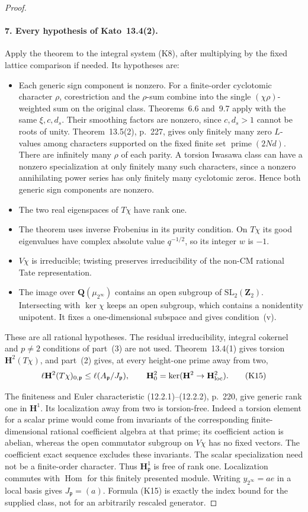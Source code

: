 \begin{proof}
\paragraph{7. Every hypothesis of Kato~13.4(2).}
Apply the theorem to the integral system (K8), after multiplying
by the fixed lattice comparison if needed. Its hypotheses are:
\begin{itemize}
\item Each generic sign component is nonzero. For a finite-order
cyclotomic character $\rho$, corestriction and the $\rho$-sum combine
into the single $(\chi\rho)$-weighted sum on the original class.
Theorems~6.6 and~9.7 apply with the same $\xi,c,d_s$. Their smoothing
factors are nonzero, since $c,d_s>1$ cannot be roots of unity.
Theorem~13.5(2), p.~227, gives only finitely many zero $L$-values
among characters supported on the fixed finite set
$\operatorname{prime}(2Nd)$. There are infinitely many $\rho$ of
each parity. A torsion Iwasawa class can have a nonzero specialization
at only finitely many such characters, since a nonzero annihilating
power series has only finitely many cyclotomic zeros. Hence both
generic sign components are nonzero.
\item The two real eigenspaces of $T\chi$ have rank one.
\item The theorem uses inverse Frobenius in its purity condition.
On $T\chi$ its good eigenvalues have complex absolute value
$q^{-1/2}$, so its integer $w$ is $-1$.
\item $V\chi$ is irreducible; twisting preserves irreducibility of
the non-CM rational Tate representation.
\item The image over $\mathbf Q(\mu_{2^\infty})$ contains an open
subgroup of $\mathrm{SL}_2(\mathbf Z_2)$. Intersecting with
$\ker\chi$ keeps an open subgroup, which contains a nonidentity
unipotent. It fixes a one-dimensional subspace and gives condition~(v).
\end{itemize}
These are all rational hypotheses. The residual irreducibility,
integral cokernel and $p\ne2$ conditions of part~(3) are not used.
Theorem~13.4(1) gives torsion $\mathbf H^2(T\chi)$, and part~(2)
gives, at every height-one prime away from two,
\[
 \ell\mathbf H^2(T\chi)_{0,\mathfrak p}
       \leq\ell(A_{\mathfrak p}/J_{\mathfrak p}),\qquad
 \mathbf H^2_0=\ker(\mathbf H^2\to\mathbf H^2_{\rm loc}). \tag{K15}
\]

The finiteness and Euler characteristic (12.2.1)--(12.2.2), p.~220,
give generic rank one in $\mathbf H^1$. Its localization away
from two is torsion-free. Indeed a torsion element for a scalar
prime would come from invariants of the corresponding finite-dimensional
rational coefficient algebra at that prime; its coefficient action is
abelian, whereas the open commutator subgroup on $V\chi$ has no
fixed vectors. The coefficient exact sequence excludes these
invariants. The scalar specialization need not be a finite-order
character. Thus $\mathbf H^1_{\mathfrak p}$ is free of rank one.
Localization commutes with $\operatorname{Hom}$ for this finitely
presented module. Writing $y_{2^\infty}=a e$ in a local basis gives
$J_{\mathfrak p}=(a)$. Formula (K15) is exactly the index bound for
the supplied class, not for an arbitrarily rescaled generator.


\end{proof}
